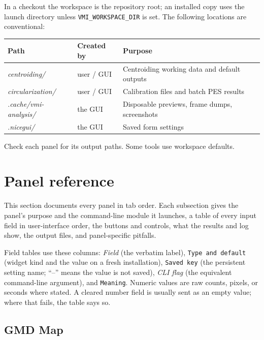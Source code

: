\documentclass[11pt,a4paper]{article}
\newcommand{\code}[1]{\texttt{#1}}
\begin{document}
In a checkout the workspace is the repository root; an installed copy uses
the launch directory unless \code{VMI\_\allowbreak{}WORKSPACE\_\allowbreak{}DIR} is set. The
following locations are conventional:

\begin{center}
\footnotesize
\begin{tabular}{@{}llp{7.4cm}@{}}
\toprule
Path & Created by & Purpose \\
\midrule
\emph{centroiding/\allowbreak{}} & user / GUI & Centroiding working data and default outputs \\
\emph{circularization/\allowbreak{}} & user / GUI & Calibration files and batch PES results \\
\emph{.cache/\allowbreak{}vmi-\allowbreak{}analysis/\allowbreak{}} & the GUI & Disposable previews, frame dumps, screenshots \\
\emph{.nicegui/\allowbreak{}} & the GUI & Saved form settings \\
\bottomrule
\end{tabular}
\end{center}

Check each panel for its output paths. Some tools use workspace defaults.

\section{Panel reference}
\label{sec:panels}

This section documents every panel in tab order. Each subsection gives the
panel's purpose and the command-line module it launches, a table of every
input field in user-interface order, the buttons and controls, what the
results and log show, the output files, and panel-specific pitfalls.

Field tables use these columns: \emph{Field} (the verbatim label),
\code{Type and default} (widget kind and the value on a fresh installation),
\code{Saved key} (the persistent setting name; ``--'' means the value is not
saved), \emph{CLI flag} (the equivalent command-line argument), and
\code{Meaning}. Numeric values are raw counts, pixels, or seconds where
stated. A cleared number field is usually sent as an empty value; where that
fails, the table says so.

\subsection{GMD Map}
\label{sec:gmdmap}
\end{document}
